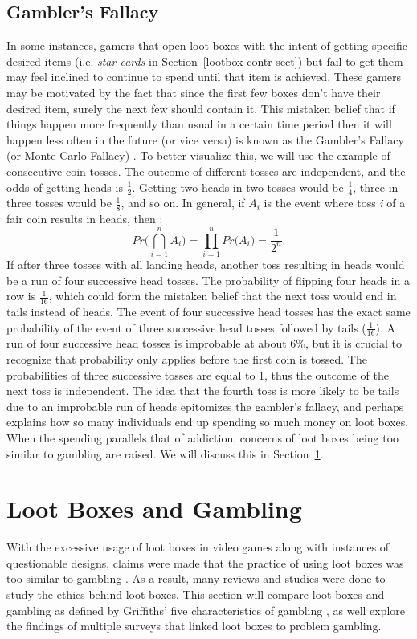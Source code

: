 \documentclass[11pt]{article}
\newcommand\genref[2]{#1~\ref{#2}}
\newcommand\sectref[1]{\genref{Section}{#1}}
\begin{document}
\subsection{Gambler's Fallacy}
In some instances, gamers that open loot boxes with the intent of getting specific desired items (i.e. 
\emph{star cards} in \sectref{lootbox-contr-sect}) but fail to get them may feel 
inclined to continue to spend until that item is achieved. These gamers may be motivated
by the fact that since the first few boxes don't have their desired item, surely the 
next few should contain it. This mistaken belief that if things happen more frequently 
than usual in a certain time period then it will happen less often in the future (or vice
versa) is known as the Gambler's Fallacy (or Monte Carlo Fallacy) \cite{kenton_2019} . To better visualize
this, we will use the example of consecutive coin tosses. The outcome of different
tosses are independent, and the odds of getting heads is \(\frac{1}{2}\). Getting two heads 
in two tosses would be \(\frac{1}{4}\), three in three tosses would be \(\frac{1}{8}\), and
so on. In general, if \(A_i\) is the event where toss \textit{i} of a fair coin results 
in heads, then :
\begin{equation}
  Pr\Bigg(\bigcap_{i=1}^{n}A_i\Bigg)  = 
  \prod_{i=1}^{n} Pr\big(A_i\big) =
  \frac{1}{2^n}.
\end{equation} 
If after three tosses with all landing heads, another toss resulting in heads would
be a run of four successive head tosses. The probability of flipping four heads in a row
is \(\frac{1}{16}\), which could form the mistaken belief that the next toss would end in
tails instead of heads. The event of four successive head tosses has the exact same 
probability of the event of three successive head tosses followed by tails (\(\frac{1}{16}\)). 
A run of four successive head tosses is improbable at about 6\%, 
but it is crucial to recognize that probability only applies before the first coin is tossed. 
The probabilities of three successive tosses are equal to 1, thus the outcome of the next toss 
is independent. The idea that the fourth toss is more likely to be tails due
to an improbable run of heads epitomizes the gambler's fallacy, and perhaps explains
how so many individuals end up spending so much money on loot boxes.
When the spending parallels that of addiction, concerns of loot boxes being 
too similar to gambling are raised. We will discuss this in \sectref{gambling-sect}.



\section{Loot Boxes and Gambling}\label{gambling-sect}
With the excessive usage of loot boxes in video games along with instances of questionable designs, 
claims were made that the practice of using loot boxes was too similar to gambling \cite{pu_28AD}. 
As a result, many reviews and studies were done to study the ethics behind
loot boxes. This section will compare loot boxes and gambling as defined by Griffiths' five characteristics 
of gambling \cite{Drummond2018}, as well explore the findings of multiple surveys that linked loot boxes to 
problem gambling. 
\end{document}
